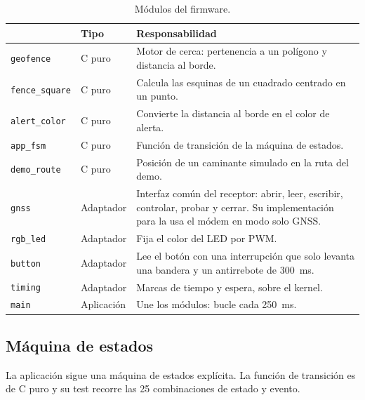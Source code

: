 \begin{table}[H]
\centering
\footnotesize
\begin{tabularx}{\textwidth}{|l l X|}
\hline
\tablehead{\textbf{Módulo} & \textbf{Tipo} & \textbf{Responsabilidad}} \\ \hline
\texttt{geofence} & C puro & Motor de cerca: pertenencia a un polígono y distancia al borde. \\ \hline
\texttt{fence\_square} & C puro & Calcula las esquinas de un cuadrado centrado en un punto. \\ \hline
\texttt{alert\_color} & C puro & Convierte la distancia al borde en el color de alerta. \\ \hline
\texttt{app\_fsm} & C puro & Función de transición de la máquina de estados. \\ \hline
\texttt{demo\_route} & C puro & Posición de un caminante simulado en la ruta del demo. \\ \hline
\texttt{gnss} & Adaptador & Interfaz común del receptor: abrir, leer, escribir, controlar, probar y cerrar. Su implementación para la \dSoc{} usa el módem en modo solo GNSS. \\ \hline
\texttt{rgb\_led} & Adaptador & Fija el color del LED por PWM. \\ \hline
\texttt{button} & Adaptador & Lee el botón con una interrupción que solo levanta una bandera y un antirrebote de 300~ms. \\ \hline
\texttt{timing} & Adaptador & Marcas de tiempo y espera, sobre el kernel. \\ \hline
\texttt{main} & Aplicación & Une los módulos: bucle cada 250~ms. \\ \hline
\end{tabularx}
\caption{Módulos del firmware.}
\end{table}

\subsection{Máquina de estados}

La aplicación sigue una máquina de estados explícita. La función de transición es de C puro y su
test recorre las 25 combinaciones de estado y evento.

